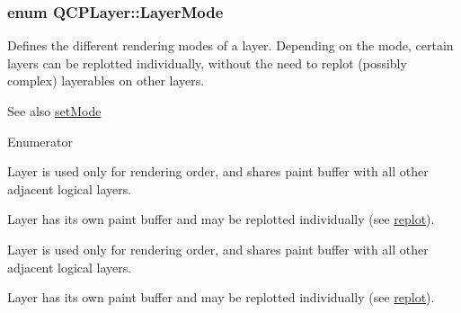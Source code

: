\subsubsection[{\texorpdfstring{Layer\+Mode}{LayerMode}}]{\setlength{\rightskip}{0pt plus 5cm}enum {\bf Q\+C\+P\+Layer\+::\+Layer\+Mode}}\hypertarget{class_q_c_p_layer_a67dcfc1590be2a1f2227c5a39bb59c7c}{}\label{class_q_c_p_layer_a67dcfc1590be2a1f2227c5a39bb59c7c}
Defines the different rendering modes of a layer. Depending on the mode, certain layers can be replotted individually, without the need to replot (possibly complex) layerables on other layers.

\begin{DoxySeeAlso}{See also}
\hyperlink{class_q_c_p_layer_a938d57b04f4e4c23cedf1711f983919b}{set\+Mode} 
\end{DoxySeeAlso}
\begin{Desc}
\item[Enumerator]\par
\begin{description}
\item[{\em 
lm\+Logical\hypertarget{class_q_c_p_layer_a67dcfc1590be2a1f2227c5a39bb59c7ca6294b5ed9040aede762c626f5108f934}{}\label{class_q_c_p_layer_a67dcfc1590be2a1f2227c5a39bb59c7ca6294b5ed9040aede762c626f5108f934}
}]Layer is used only for rendering order, and shares paint buffer with all other adjacent logical layers. \item[{\em 
lm\+Buffered\hypertarget{class_q_c_p_layer_a67dcfc1590be2a1f2227c5a39bb59c7cada274b1644a2a3c1b794c052f1601bb2}{}\label{class_q_c_p_layer_a67dcfc1590be2a1f2227c5a39bb59c7cada274b1644a2a3c1b794c052f1601bb2}
}]Layer has its own paint buffer and may be replotted individually (see \hyperlink{class_q_c_p_layer_adefd53b6db02f470151c416f42e37180}{replot}). \item[{\em 
lm\+Logical\hypertarget{class_q_c_p_layer_a67dcfc1590be2a1f2227c5a39bb59c7ca6294b5ed9040aede762c626f5108f934}{}\label{class_q_c_p_layer_a67dcfc1590be2a1f2227c5a39bb59c7ca6294b5ed9040aede762c626f5108f934}
}]Layer is used only for rendering order, and shares paint buffer with all other adjacent logical layers. \item[{\em 
lm\+Buffered\hypertarget{class_q_c_p_layer_a67dcfc1590be2a1f2227c5a39bb59c7cada274b1644a2a3c1b794c052f1601bb2}{}\label{class_q_c_p_layer_a67dcfc1590be2a1f2227c5a39bb59c7cada274b1644a2a3c1b794c052f1601bb2}
}]Layer has its own paint buffer and may be replotted individually (see \hyperlink{class_q_c_p_layer_adefd53b6db02f470151c416f42e37180}{replot}). \end{description}
\end{Desc}


